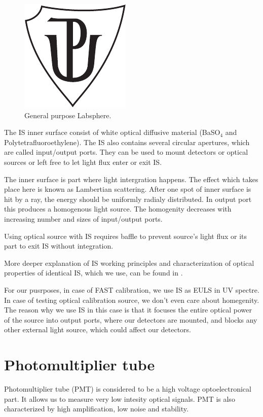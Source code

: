 \begin{figure}[H]
 \centering
 \includegraphics{up_logo_bw}
 \caption{General purpose Labsphere.}
 \label{Labsphere}
 
\end{figure}
\par
The IS inner surface consist of white optical diffusive material (BaSO$_4$ and Polytetrafluoroethylene). The IS also contains several circular apertures, which are called input/output ports. They can be used to mount detectors or optical sources or left free to let light flux enter or exit IS. 
\par
The inner surface is part where light intergration happens. The effect which takes place here is known as Lambertian scattering. After one spot of inner surface is hit by a ray, the energy should be uniformly radialy distributed. In output port this produces a homogenous light source. The homogenity decreases with increasing number and sizes of input/output ports.
\par
Using optical source with IS requires baffle to prevent source's light flux or its part to exit IS without integration.
\par
More deeper explanation of IS working principles and characterization of optical properties of identical IS, which we use, can be found in \cite{VACULA2021167169}.
\par
For our pusrposes, in case of FAST calibration, we use IS as EULS in UV spectre. In case of testing optical calibration source, we don't even care about homegenity. The reason why we use IS in this case is that it focuses the entire optical power of the source into output ports, where  our detectors are mounted, and blocks any other external light source, which could affect our detectors.

\section{Photomultiplier tube}
Photomultiplier tube (PMT) is considered to be a high voltage optoelectronical part. It allows us to measure very low intesity optical signals. PMT is also characterized by high amplification, low noise and stability. 
